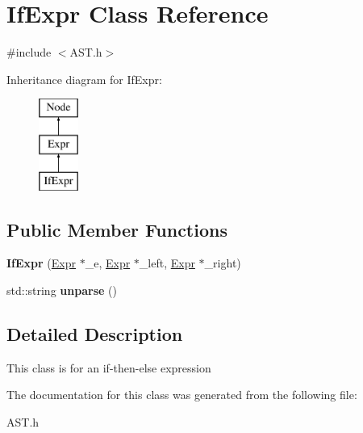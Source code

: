 \hypertarget{classIfExpr}{\section{If\-Expr Class Reference}
\label{classIfExpr}
}


{\ttfamily \#include $<$A\-S\-T.\-h$>$}

Inheritance diagram for If\-Expr\-:\begin{figure}[H]
\begin{center}
\leavevmode
\includegraphics[height=3.000000cm]{classIfExpr}
\end{center}
\end{figure}
\subsection*{Public Member Functions}
\begin{DoxyCompactItemize}
\item 
\hypertarget{classIfExpr_a3c49b1c3aea31559e36e8fb6443726ed}{{\bfseries If\-Expr} (\hyperlink{classExpr}{Expr} $\ast$\-\_\-e, \hyperlink{classExpr}{Expr} $\ast$\-\_\-left, \hyperlink{classExpr}{Expr} $\ast$\-\_\-right)}\label{classIfExpr_a3c49b1c3aea31559e36e8fb6443726ed}

\item 
\hypertarget{classIfExpr_a49667b0be8ad229abbd8666fea195028}{std\-::string {\bfseries unparse} ()}\label{classIfExpr_a49667b0be8ad229abbd8666fea195028}

\end{DoxyCompactItemize}


\subsection{Detailed Description}
This class is for an if-\/then-\/else expression 

The documentation for this class was generated from the following file\-:\begin{DoxyCompactItemize}
\item 
A\-S\-T.\-h\end{DoxyCompactItemize}
